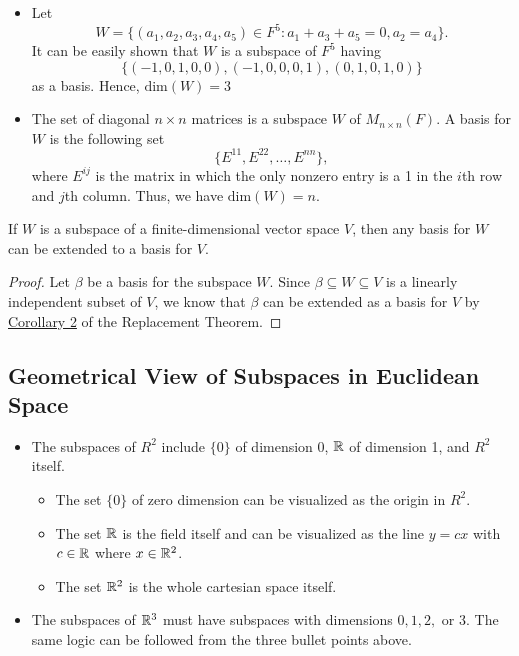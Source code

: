 \begin{eg}
    \begin{itemize}
        \item Let  
    \[  W = \{ (a_{1}, a_{2}, a_{3}, a_{4}, a_{5}) \in F^{5} : a_{1} + a_{3} + a_{5} = 0 , a_{2} = a_{4} \}. \]
    It can be easily shown that \( W  \) is a subspace of \( F^{5} \) having 
    \[  \{ (-1,0,1,0,0), (-1,0,0,0,1), (0,1,0,1,0) \}  \] as a basis. Hence, \( \text{dim}(W) = 3  \)
    \item The set of diagonal \( n \times n  \) matrices is a subspace \( W  \) of \( M_{n \times n}(F)  \). A basis for \( W  \) is the following set 
        \[  \{ E^{11} , E^{22} , \dots, E^{n n } \},  \]
        where \( E^{ij}  \) is the matrix in which the only nonzero entry is a 1 in the \( i \)th row and \( j \)th column. Thus, we have \( \text{dim}(W) = n  \).
    \end{itemize}
\end{eg}

\begin{corollary}
    If \( W  \) is a subspace of a finite-dimensional vector space \( V  \), then any basis for \( W  \) can be extended to a basis for \( V  \).
\end{corollary}
\begin{proof}
Let \( \beta \) be a basis for the subspace \( W    \). Since \( \beta \subseteq W \subseteq V   \) is a linearly independent subset of \( V  \), we know that \( \beta \) can be extended as a basis for \( V  \) by {\hyperref[2nd Corollary to RT]{Corollary 2}} of the Replacement Theorem.
\end{proof}


\subsection{Geometrical View of Subspaces in Euclidean Space}

\begin{itemize}
    \item The subspaces of \( R^{2} \) include \( \{ 0 \}   \) of dimension 0, \( \mathbb{R}  \) of dimension 1, and \( R^{2} \) itself. 
        \begin{itemize}
            \item The set \(\{ 0 \}   \) of zero dimension can be visualized as the origin in \( R^{2} \).
            \item The set \( \mathbb{R} \) is the field itself and can be visualized as the line \( y = cx \) with \( c \in \mathbb{R}  \) where \( x \in \mathbb{R}^{2} \).
            \item The set \( \mathbb{R}^{2} \) is the whole cartesian space itself.
        \end{itemize}
    \item The subspaces of \( \mathbb{R}^{3} \) must have subspaces with dimensions \( 0, 1, 2,  \) or \( 3 \). The same logic can be followed from the three bullet points above.
\end{itemize}

